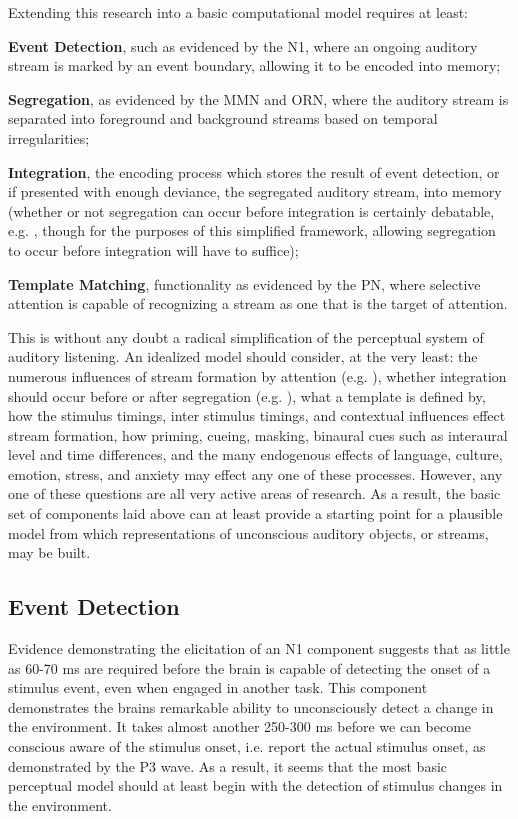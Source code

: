\documentclass[a4paper,10pt,final]{ThesisStyle}
\begin{document}
Extending this research into a basic computational model requires at least: 
\begin{enumerateb}
\item \textbf{Event Detection}, such as evidenced by the N1, where an ongoing auditory stream is marked by an event boundary, allowing it to be encoded into memory; 
\item \textbf{Segregation}, as evidenced by the MMN and ORN, where the auditory stream is separated into foreground and background streams based on temporal irregularities;
\item \textbf{Integration}, the encoding process which stores the result of event detection, or if presented with enough deviance, the segregated auditory stream, into memory (whether or not segregation can occur before integration is certainly debatable, e.g. \cite{Sussman2005}, though for the purposes of this simplified framework, allowing segregation to occur before integration will have to suffice);
\item \textbf{Template Matching}, functionality as evidenced by the PN, where selective attention is capable of recognizing a stream as one that is the target of attention. 
\end{enumerateb}

This is without any doubt a radical simplification of the perceptual system of auditory listening.   An idealized model should consider, at the very least: the numerous influences of stream formation by attention (e.g. \cite{Shamma2011}), whether integration should occur before or after segregation (e.g. \cite{Sussman2005}), what a template is defined by, how the stimulus timings, inter stimulus timings, and contextual influences effect stream formation, how priming, cueing, masking, binaural cues such as interaural level and time differences, and the many endogenous effects of language, culture, emotion, stress, and anxiety may effect any one of these processes.  However, any one of these questions are all very active areas of research.  As a result, the basic set of components laid above can at least provide a starting point for a plausible model from which representations of unconscious auditory objects, or streams, may be built.  

\subsection{Event Detection}

Evidence demonstrating the elicitation of an N1 component suggests that as little as 60-70 ms are required before the brain is capable of detecting the onset of a stimulus event, even when engaged in another task.  This component demonstrates the brains remarkable ability to unconsciously detect a change in the environment.  It takes almost another 250-300 ms before we can become conscious aware of the stimulus onset, i.e. report the actual stimulus onset, as demonstrated by the P3 wave.  As a result, it seems that the most basic perceptual model should at least begin with the detection of stimulus changes in the environment.  
\end{document}
